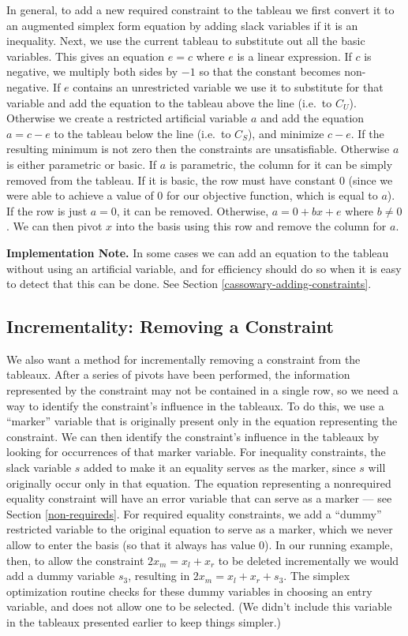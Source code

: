 \documentclass{article}
\begin{document}
In general, to add a new required constraint to the tableau we first
convert it to an augmented simplex form equation by adding slack variables
if it is an inequality.  Next, we use the current tableau to substitute out
all the basic variables.  This gives an equation $e = c$ where $e$ is a
linear expression.  If $c$ is negative, we multiply both sides by $-1$ so
that the constant becomes non-negative.  If $e$ contains an unrestricted
variable we use it to substitute for that variable and add the equation to
the tableau above the line (i.e.\ to $C_U$).  Otherwise we create a
restricted artificial variable $a$ and add the equation $a = c - e$ to the
tableau below the line (i.e.\ to $C_S$), and minimize $c - e$. If the
resulting minimum is not zero then the constraints are unsatisfiable.
Otherwise $a$ is either parametric or basic.  If $a$ is parametric, the
column for it can be simply removed from the tableau.  If it is basic, the
row must have constant 0 (since we were able to achieve a value of 0 for
our objective function, which is equal to $a$).  If the row is just $a =
0$, it can be removed.  Otherwise, $a = 0 + b x + e$ where $b \neq 0$.  We
can then pivot $x$ into the basis using this row and remove the column for
$a$.

{\bf Implementation Note.}  In some cases we can add an equation to the
tableau without using an artificial variable, and for efficiency should do
so when it is easy to detect that this can be done.  See Section
\ref{cassowary-adding-constraints}.

\subsection{Incrementality: Removing a Constraint}
\label{removing-constraints}

We also want a method for incrementally removing a constraint from the
tableaux.  After a series of pivots have been performed, the information
represented by the constraint may not be contained in a single row, so we
need a way to identify the constraint's influence in the tableaux.  To do
this, we use a ``marker'' variable that is originally present only in the
equation representing the constraint.  We can then identify the
constraint's influence in the tableaux by looking for occurrences of that
marker variable.  For inequality constraints, the slack variable $s$ added
to make it an equality serves as the marker, since $s$ will originally
occur only in that equation.  The equation representing a nonrequired
equality constraint will have an error variable that can serve as a marker
--- see Section \ref{non-requireds}.  For required equality constraints, we
add a ``dummy'' restricted variable to the original equation to serve as a
marker, which we never allow to enter the basis (so that it always has
value 0).  In our running example, then, to allow the constraint $2 x_m =
x_l + x_r$ to be deleted incrementally we would add a dummy variable $s_3$,
resulting in $2 x_m = x_l + x_r + s_3$.  The simplex optimization routine
checks for these dummy variables in choosing an entry variable, and does
not allow one to be selected.  (We didn't include this variable in the
tableaux presented earlier to keep things simpler.)
\end{document}
